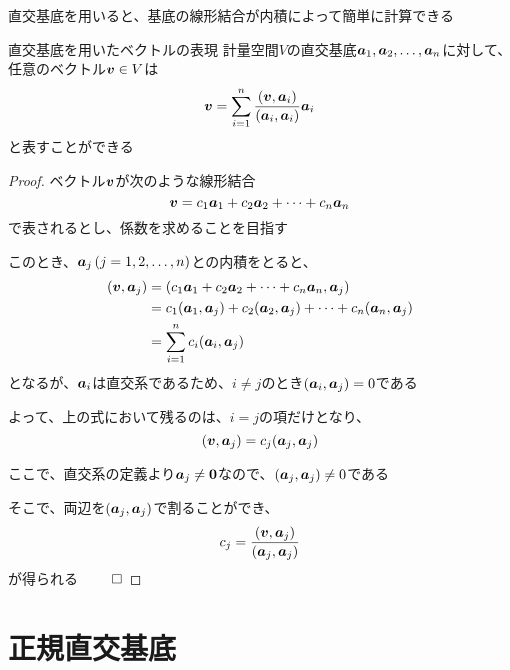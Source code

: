 \documentclass[../../../topic_linear-algebra]{subfiles}
\begin{document}
\sectionline

直交基底を用いると、基底の線形結合が内積によって簡単に計算できる

\begin{theorem}{直交基底を用いたベクトルの表現}\label{thm:vector-expansion-by-orthogonal-basis}
  計量空間$V$の直交基底$\vb*{a}_1, \vb*{a}_2, \ldots, \vb*{a}_n$に対して、任意のベクトル$\vb*{v} \in V$は
  \begin{equation*}
    \vb*{v} = \sum_{i=1}^n \frac{(\vb*{v}, \vb*{a}_i)}{(\vb*{a}_i, \vb*{a}_i)} \vb*{a}_i
  \end{equation*}
  と表すことができる
\end{theorem}

\begin{proof}
  ベクトル$\vb*{v}$が次のような線形結合
  \begin{equation*}
    \vb*{v} = c_1 \vb*{a}_1 + c_2 \vb*{a}_2 + \cdots + c_n \vb*{a}_n
  \end{equation*}
  で表されるとし、係数を求めることを目指す

  このとき、$\vb*{a}_j\, (j=1,2,\ldots,n)$との内積をとると、
  \begin{align*}
    (\vb*{v}, \vb*{a}_j) & = (c_1 \vb*{a}_1 + c_2 \vb*{a}_2 + \cdots + c_n \vb*{a}_n, \vb*{a}_j)                           \\
                         & = c_1 (\vb*{a}_1, \vb*{a}_j) + c_2 (\vb*{a}_2, \vb*{a}_j) + \cdots + c_n (\vb*{a}_n, \vb*{a}_j) \\
                         & = \sum_{i=1}^n c_i (\vb*{a}_i, \vb*{a}_j)
  \end{align*}
  となるが、$\vb*{a}_i$は直交系であるため、$i \neq j$のとき$(\vb*{a}_i, \vb*{a}_j) = 0$である

  よって、上の式において残るのは、$i=j$の項だけとなり、
  \begin{equation*}
    (\vb*{v}, \vb*{a}_j) = c_j (\vb*{a}_j, \vb*{a}_j)
  \end{equation*}

  ここで、直交系の定義より$\vb*{a}_j \neq \vb*{0}$なので、$(\vb*{a}_j, \vb*{a}_j) \neq 0$である

  そこで、両辺を$(\vb*{a}_j, \vb*{a}_j)$で割ることができ、
  \begin{equation*}
    c_j = \frac{(\vb*{v}, \vb*{a}_j)}{(\vb*{a}_j, \vb*{a}_j)}
  \end{equation*}
  が得られる $\qed$
\end{proof}

\sectionline
\section{正規直交基底}
\end{document}
